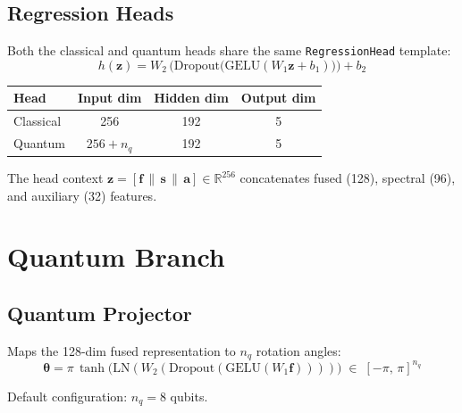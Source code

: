 \documentclass[11pt,a4paper]{article}
\begin{document}
\subsection{Regression Heads}

Both the classical and quantum heads share the same \texttt{RegressionHead} template:
\begin{equation}
h(\mathbf{z}) = W_2\,\bigl(\text{Dropout}\bigl(\text{GELU}(W_1\mathbf{z} + b_1)\bigr)\bigr) + b_2
\end{equation}

\begin{center}
\begin{tabular}{l c c c}
\toprule
\textbf{Head} & \textbf{Input dim} & \textbf{Hidden dim} & \textbf{Output dim} \\
\midrule
Classical & 256 & 192 & 5 \\
Quantum & $256 + n_q$ & 192 & 5 \\
\bottomrule
\end{tabular}
\end{center}

\noindent The head context $\mathbf{z}=[\mathbf{f}\,\|\,\mathbf{s}\,\|\,\mathbf{a}]\in\mathbb{R}^{256}$
concatenates fused (128), spectral (96), and auxiliary (32) features.

\section{Quantum Branch}

\subsection{Quantum Projector}

Maps the 128-dim fused representation to $n_q$ rotation angles:
\begin{equation}
\boldsymbol{\theta} = \pi\,\tanh\!\bigl(\text{LN}(W_2(\text{Dropout}(\text{GELU}(W_1\mathbf{f}))))\bigr) \;\in\; [-\pi,\,\pi]^{n_q}
\end{equation}

Default configuration: $n_q = 8$ qubits.
\end{document}
